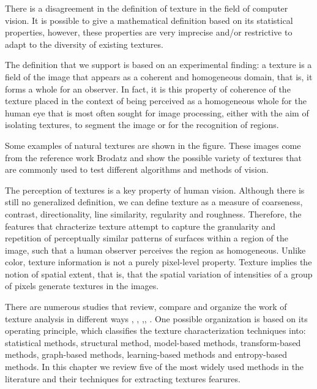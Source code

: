 There is a disagreement in the definition of texture in the field of computer vision. It is possible to give a mathematical definition based on its statistical properties, however, these properties are very imprecise and/or restrictive to adapt to the diversity of existing textures.

The definition that we support is based on an experimental finding: a texture is a field of the image that appears as a coherent and homogeneous domain, that is, it forms a whole for an observer. In fact, it is this property of coherence of the texture placed in the context of being perceived as a homogeneous whole for the human eye that is most often sought for image processing, either with the aim of isolating textures, to segment the image or for the recognition of regions.

Some examples of natural textures are shown in the figure. These images come from the reference work Brodatz and show the possible variety of textures that are commonly used to test different algorithms and methods of vision.

The perception of textures is a key property of human vision. Although there is still no generalized definition, we can define texture as a measure of coarseness, contrast, directionality, line similarity, regularity and roughness. Therefore, the features that chracterize texture attempt to capture the granularity and repetition of perceptually similar patterns of surfaces within a region of the image, such that a human observer perceives the region as homogeneous.
Unlike color, texture information is not a purely pixel-level property. Texture implies the notion of spatial extent, that is, that the spatial variation of intensities of a group of pixels generate textures in the images.

There are numerous studies that review, compare and organize the work of texture analysis in different ways \citep{Materka.Strzelecki:Report:1998}, \citep{Zhang.Tan:PR:2002}, \citep{Bharati.Liu.ea:CILS:2004},\citep{Lukashevich.Sadykhov:ICPCI:2012}, \citep{Humeau-Heurtier:IEEEAccess:2019}. One possible organization is based on its operating principle, which classifies the texture characterization techniques into: statistical methods, structural method, model-based methods, transform-based methods, graph-based methods, learning-based methods and entropy-based methods. In this chapter we review five of the most widely used methods in the literature and their techniques for extracting textures fearures.

%	

